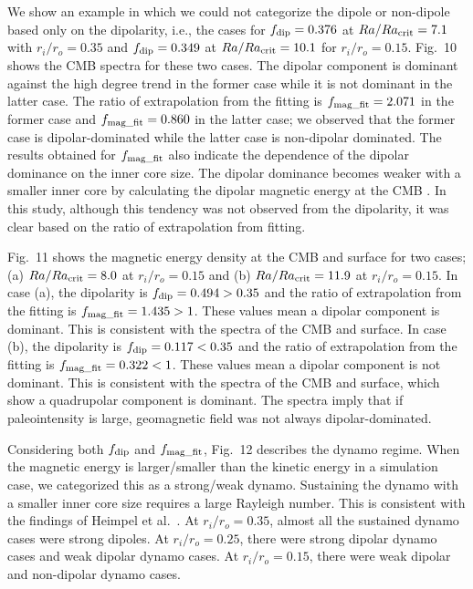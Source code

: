 We show an example in which we could not categorize the dipole or non-dipole based only on the dipolarity, i.e., the cases for $f_{\rm dip} = 0.376$ at $Ra/Ra_{\rm crit} = 7.1$ with $r_i/r_o = 0.35$ and $f_{\rm dip} = 0.349$ at $Ra/Ra_{\rm crit} = 10.1$ for $r_i/r_o = 0.15$. 
Fig.~10 shows the CMB spectra for these two cases. 
The dipolar component is dominant against the high degree trend in the former case while it is not dominant in the latter case. 
The ratio of extrapolation from the fitting is $f_{\rm mag\_fit} = 2.071$ in the former case and $f_{\rm mag\_fit} = 0.860$ in the latter case; we observed that the former case is dipolar-dominated while the latter case is non-dipolar dominated. 
The results obtained for $f_{\rm mag\_fit}$  also indicate the dependence of the dipolar dominance on the inner core size. 
The dipolar dominance becomes weaker with a smaller inner core by calculating the dipolar magnetic energy at the CMB \cite{Heimpel:2005}. 
In this study, although this tendency was not observed from the dipolarity, it was clear based on the ratio of extrapolation from fitting.

{\color{red}
Fig.~11 shows the magnetic energy density at the CMB and surface for two cases; (a) $Ra/Ra_{\rm crit} = 8.0$ at $r_i/r_o = 0.15$ and (b) $Ra/Ra_{\rm crit} = 11.9$ at $r_i/r_o = 0.15$. 
In case (a), the dipolarity is $f_{\rm dip} = 0.494 > 0.35$ and the ratio of extrapolation from the fitting is $f_{\rm mag\_fit} = 1.435 > 1$. 
These values mean a dipolar component is dominant. 
This is consistent with the spectra of the CMB and surface. 
In case (b), the dipolarity is $f_{\rm dip} = 0.117 < 0.35$ and the ratio of extrapolation from the fitting is $f_{\rm mag\_fit} = 0.322 < 1$. 
These values mean a dipolar component is not dominant. 
This is consistent with the spectra of the CMB and surface, which show a quadrupolar component is dominant. 
The spectra imply that if paleointensity is large, geomagnetic field was not always dipolar-dominated.}

Considering both $f_{\rm dip}$ and $f_{\rm mag\_fit}$, Fig.~{\color{red}12} describes the dynamo regime. 
When the magnetic energy is larger/smaller than the kinetic energy in a simulation case, we categorized this as a strong/weak dynamo. 
Sustaining the dynamo with a smaller inner core size requires a large Rayleigh number. 
This is consistent with the findings of Heimpel et al.\ . 
At $r_i/r_o = 0.35$, almost all the sustained dynamo cases were strong dipoles. 
At $r_i/r_o = 0.25$, there were strong dipolar dynamo cases and weak dipolar dynamo cases. 
At $r_i/r_o = 0.15$, there were weak dipolar and non-dipolar dynamo cases.

